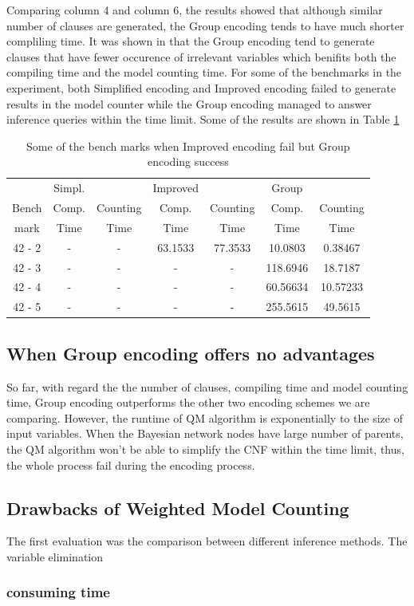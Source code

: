 Comparing column 4 and column 6, the results showed that although similar number of clauses are generated, the Group encoding tends to have much shorter compliling time. It was shown in \cite{2006-enc3} that the Group encoding tend to generate clauses that have fewer occurence of irrelevant variables which benifits both the compiling time and the model counting time. For some of the benchmarks in the experiment, both Simplified encoding and Improved encoding failed to generate results in the model counter while the Group encoding managed to answer inference queries within the time limit. Some of the results are shown in Table \ref{tab:good Group encoding}\\
\begin{table}[]
\centering
\begin{tabular}{c|c c | c c | c c}
    \hline
    	&	Simpl.	&		&	Improved	&		&	Group	&		\\
    
	Bench		&	Comp. 	&	Counting 	&	Comp. 	&	Counting 	&	Comp. 	&	Counting 	\\
mark	&	Time	&	Time	&	Time	&	Time	&	Time	&	Time	\\
	\hline
	\hline
    42	-	2	&	-	&	-	&	63.1533	&	77.3533	&	10.0803	&	0.38467	\\
    42	-	3	&	-	&	-	&	-	&	-	&	118.6946	&	18.7187	\\
    42	-	4	&	-	&	-	&	-	&	-	&	60.56634	&	10.57233	\\
    42	-	5	&	-	&	-	&	-	&	-	&	255.5615	&	49.5615	\\
    \hline
\end{tabular}
\caption{Some of the bench marks when Improved encoding fail but Group encoding success}
    \label{tab:good Group encoding}
\end{table}

\subsection{When Group encoding offers no advantages}
So far, with regard the the number of clauses, compiling time and model counting time, Group encoding outperforms the other two encoding schemes we are comparing. However, the runtime of QM algorithm is exponentially to the size of input variables. When the Bayesian network nodes have large number of parents, the QM algorithm won't be able to simplify the CNF within the time limit, thus, the whole process fail during the encoding process.

\subsection{Drawbacks of Weighted Model Counting}
The first evaluation was the comparison between different inference methods.
The variable elimination
\subsubsection{consuming time}
